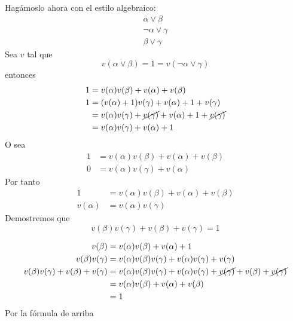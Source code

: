\begin{ejercicio*}
\begin{enumerate}
        Hagámoslo ahora con el estilo algebraico:
        \begin{equation*}
            \begin{array}{c}
                \alpha\lor\beta \\
                \lnot\alpha\lor\gamma \\
                \hline
                \beta\lor\gamma
            \end{array}
        \end{equation*}
        Sea $v$ tal que
        \begin{equation*}
            v(\alpha\lor\beta)=1=v(\lnot\alpha\lor\gamma)
        \end{equation*}
        entonces
        \begin{align*}
            1 &= v(\alpha)v(\beta)+v(\alpha)+v(\beta) \\
            1 &= (v(\alpha)+1)v(\gamma) + v(\alpha) + 1 + v(\gamma) \\
              &= v(\alpha)v(\gamma)+\cancel{v(\gamma)}+v(\alpha)+1+\cancel{v(\gamma)} \\
              &= v(\alpha)v(\gamma)+v(\alpha)+1
        \end{align*}
        O sea
        \begin{align*}
            1 &= v(\alpha)v(\beta) + v(\alpha) + v(\beta) \\
            0 &= v(\alpha)v(\gamma)+v(\alpha)
        \end{align*}
        Por tanto
        \begin{align*}
            1 &= v(\alpha)v(\beta) + v(\alpha) + v(\beta) \\
            v(\alpha) &= v(\alpha)v(\gamma)
        \end{align*}
        Demostremos que 
        \begin{equation*}
            v(\beta)v(\gamma)+v(\beta)+v(\gamma) = 1
        \end{equation*}

        \begin{align*}
            v(\beta) &= v(\alpha)v(\beta)+v(\alpha)+1 \\
            v(\beta)v(\gamma) &= v(\alpha)v(\beta)v(\gamma) + v(\alpha)v(\gamma) + v(\gamma) \\
            v(\beta)v(\gamma) + v(\beta) + v(\gamma) &= v(\alpha)v(\beta)v(\gamma) + v(\alpha)v(\gamma) + \cancel{v(\gamma)} + v(\beta) + \cancel{v(\gamma)} \\
                                                     &= v(\alpha)v(\beta) + v(\alpha) + v(\beta) \\
                                                     &= 1
        \end{align*}
        Por la fórmula de arriba

\end{enumerate}

\end{ejercicio*}

